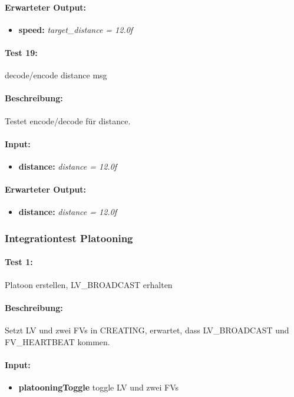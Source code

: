 \documentclass[a4paper, 12pt, titlepage]{scrartcl}
\begin{document}
{			\paragraph{Erwarteter Output:}
			\begin{itemize} \itemsep-0.5em
				\item \textbf{speed:} \emph{target\_distance = 12.0f}
			\end{itemize}
			
			\paragraph{Test 19:}{decode/encode distance msg}
			\paragraph{Beschreibung:} Testet encode/decode für distance.
			\paragraph{Input:}
			\begin{itemize} \itemsep-0.5em
				\item \textbf{distance:} \emph{distance = 12.0f}
			\end{itemize}
			\paragraph{Erwarteter Output:}
			\begin{itemize} \itemsep-0.5em
				\item \textbf{distance:} \emph{distance = 12.0f}
			\end{itemize}
									
		\subsubsection{Integrationtest Platooning}
			\label{integrationtest_platooning}
			\paragraph{Test 1:}{Platoon erstellen, LV\_BROADCAST erhalten}
			\paragraph{Beschreibung:} Setzt LV und zwei FVs in CREATING, erwartet, dass LV\_BROADCAST und FV\_HEARTBEAT kommen.
			\paragraph{Input:}
			\begin{itemize} \itemsep-0.5em
				\item \textbf{platooningToggle} toggle LV und zwei FVs 
			\end{itemize}

}
\end{document}
